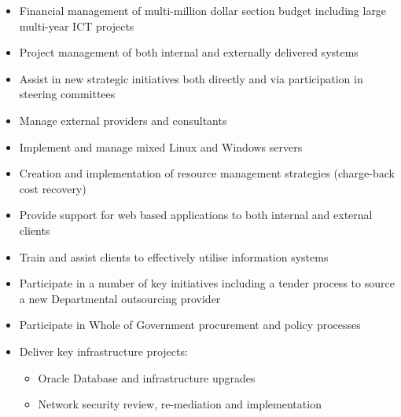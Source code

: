 \documentclass[]{friggeri-cv} %
\begin{document}
\begin{entrylist}
{\begin{itemize}
\item Financial management of multi-million dollar section budget including large multi-year ICT projects
\item Project management of both internal and externally delivered systems
\item Assist in new strategic initiatives both directly and via participation in steering committees
\item Manage external providers and consultants
\item Implement and manage mixed Linux and Windows servers
\item Creation and implementation of resource management strategies (charge-back cost recovery)
\item Provide support for web based applications to both internal and external clients
\item Train and assist clients to effectively utilise information systems
\item Participate in a number of key initiatives including a tender process to source a new Departmental outsourcing provider
\item Participate in Whole of Government procurement and policy processes
\item Deliver key infrastructure projects:
\begin{itemize}
\item Oracle Database and infrastructure upgrades
\item Network security review, re-mediation and implementation
\end{itemize}
\end{itemize}}
\end{entrylist}
\end{document}
